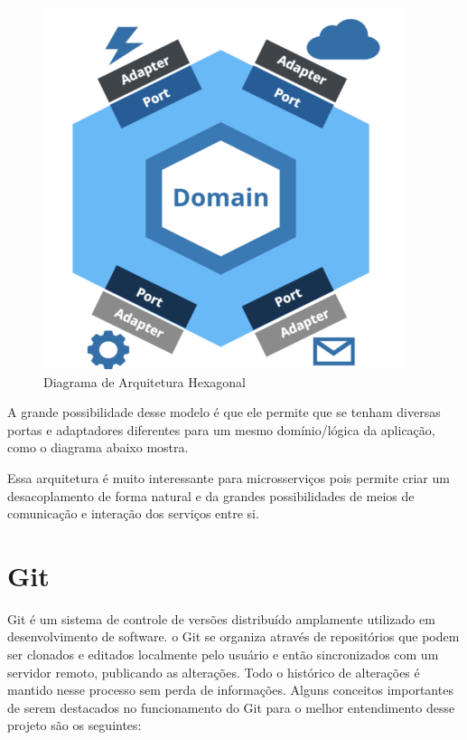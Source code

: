	\begin{figure}[htpb]
	    \caption{Diagrama de Arquitetura Hexagonal}
	    \begin{center}
	        \includegraphics[scale=0.6]{pictures/hexagonal1.png}
	    \end{center}
	    \label{fig:hexagonal1}
	\end{figure}

	A grande possibilidade desse modelo é que ele permite que se tenham diversas portas e adaptadores diferentes para um mesmo domínio/lógica da aplicação, como o diagrama abaixo mostra.
	
	Essa arquitetura é muito interessante para microsserviços pois permite criar um desacoplamento de forma natural e da grandes possibilidades de meios de comunicação e interação dos serviços entre si.
	
	\section{Git}
	
	Git é um sistema de controle de versões distribuído amplamente utilizado em desenvolvimento de software. o Git se organiza através de repositórios que podem ser clonados e editados localmente pelo usuário e então sincronizados com um servidor remoto, publicando as alterações. Todo o histórico de alterações é mantido nesse processo sem perda de informações.
	Alguns conceitos importantes de serem destacados no funcionamento do Git para o melhor entendimento desse projeto são os seguintes:
	
